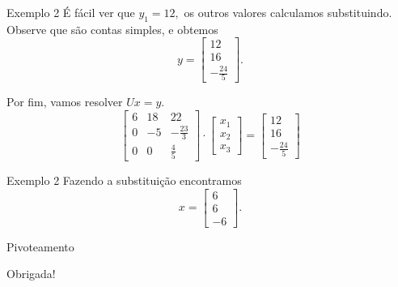 \documentclass[]{beamer}
\begin{document}
\begin{frame}{Exemplo 2}
É fácil ver que $y_1=12,$ os outros valores calculamos substituindo. Observe que são contas simples, e obtemos $$y=\begin{bmatrix}12\\ 16\\ -\frac{24}{5}\end{bmatrix}.$$

Por fim, vamos resolver $Ux=y.$
$$\begin{bmatrix}6&18&22\\ 0&-5&-\frac{23}{3}\\ 0&0&\frac{4}{5}\end{bmatrix}\cdot \begin{bmatrix}x_1\\ x_2\\ x_3\end{bmatrix}=\begin{bmatrix}12\\ 16\\ -\frac{24}{5}\end{bmatrix}$$
\end{frame}


\begin{frame}{Exemplo 2}
Fazendo a substituição encontramos  $$x=\begin{bmatrix}6\\ 6\\ -6\end{bmatrix}.$$
\end{frame}

\begin{frame}{Pivoteamento}

\end{frame}

\begin{frame}
\vfill
\vfill
\vfill
\begin{center}
	\Huge Obrigada!
\end{center}
\vfill
\vfill

\end{frame}
\end{document}
